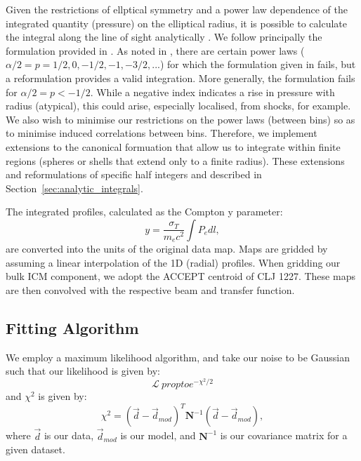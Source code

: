 \documentclass[iop,numberedappendix,apj]{emulateapj}
\begin{document}
Given the restrictions of ellptical symmetry and a power law dependence of the integrated quantity (pressure) on the
elliptical radius, it is possible to calculate the integral along the line of sight analytically
\citep[e.g.][]{vikhlinin2001a,korngut2011}. We follow
principally the formulation provided in \citet{korngut2011}. As noted in \citet{sarazin2016}, there are certain power
laws ($\alpha/2 = p = 1/2, 0 , -1/2, -1, -3/2, ...$) for which the formulation given in \citet{korngut2011} fails,
but a reformulation provides a valid integration. More generally, the formulation fails for $\alpha/2 = p < -1/2$.
While a negative index indicates a rise in pressure with radius (atypical), this could arise, especially localised,
from shocks, for example. We also wish to minimise our restrictions on the power laws (between bins) so as to minimise
induced correlations between bins. Therefore, we implement extensions to the canonical formuation that allow us to
integrate within finite regions (spheres or shells that extend only to a finite radius). These extensions and
reformulations of specific half integers and described in Section~\ref{sec:analytic_integrals}.

The integrated profiles, calculated as the Compton y parameter:
\begin{equation}
  y = \frac{\sigma_T}{m_e c^2} \int P_e dl,
  \label{eqn:compton_y}
\end{equation}
are converted into the units of the original data map. Maps are gridded by assuming a linear interpolation
of the 1D (radial) profiles.
When gridding our bulk ICM component, we adopt the ACCEPT centroid of CLJ 1227.
These maps are then convolved with the respective beam and transfer function.


\subsection{Fitting Algorithm}

We employ a maximum likelihood algorithm, and take our noise to be Gaussian such that our likelihood is given
by:
\begin{equation}
  \mathcal{L} \ propto e^{-\chi^2 / 2} 
  \label{eqn:likelihood}
\end{equation}
and $\chi^2$ is given by:
\begin{equation}
  \chi^2 = (\overrightarrow{d} - \overrightarrow{d}_{mod})^T \mathbf{N}^{-1} (\overrightarrow{d} - \overrightarrow{d}_{mod}),
  \label{eqn:chi_sq}
\end{equation}
where $\overrightarrow{d}$ is our data, $\overrightarrow{d}_{mod}$ is our model, and $\mathbf{N}^{-1}$ is our
covariance matrix for a given dataset.
\end{document}
